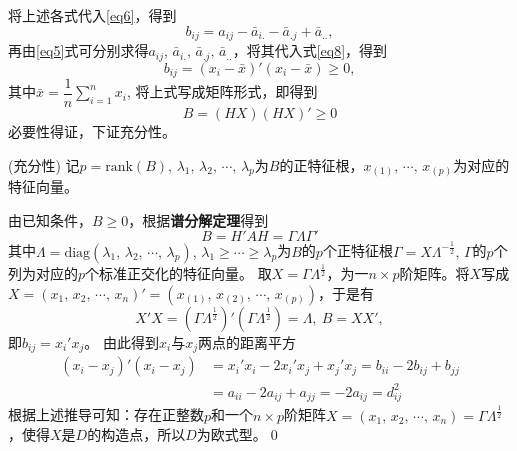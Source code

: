 \documentclass[UTF8, compress]{ctexbeamer}
\begin{document}
	\begin{frame}
		\pause
			将上述各式代入\eqref{eq6}，得到
			\begin{equation}
			\label{eq8}
			b_{ij}=a_{ij}-\bar{a}_{i.}-\bar{a}_{.j}+\bar{a}_{..},
			\end{equation}
		\pause
			再由\eqref{eq5}式可分别求得$a_{ij},\,\bar{a}_{i.},\,\bar{a}_{.j},\,\bar{a}_{..}$，将其代入式\eqref{eq8}，得到
			\begin{equation}
			b_{ij}=(x_i-\bar{x})'(x_i-\bar{x})\geqslant0,
			\end{equation}
			其中$\bar{x}=\dfrac1n\sum\limits_{i=1}^nx_i$,
		\pause
			将上式写成矩阵形式，即得到
			\begin{equation}
			B=(HX)(HX)'\geqslant 0
			\end{equation}
			必要性得证，下证充分性。\\
		\pause
		
			\vspace{.5cm}
			(充分性) 记$p=\mathrm{rank}(B),\,\lambda_1,\,\lambda_2,\,\cdots,\,\lambda_p$为$B$的正特征根，$x_{(1)},\,\cdots,\,x_{(p)}$为对应的特征向量。
	\end{frame}


	\begin{frame}
		
		
		\pause
			由已知条件，$B\geqslant0$，根据\textbf{谱分解定理}得到
			\begin{equation}
			B=H'AH=\varGamma\Lambda\varGamma'
			\end{equation}
			其中$\Lambda=\mathrm{diag}(\lambda_1,\,\lambda_2,\,\cdots,\,\lambda_p),\,\lambda_1\geqslant\cdots\geqslant\lambda_p$为$B$的$p$个正特征根$\varGamma=X\Lambda^{-\frac12},\,\varGamma$的$p$个列为对应的$p$个标准正交化的特征向量。
		\pause
			取$X=\varGamma\Lambda^{\frac12}$，为一$n\times p$阶矩阵。将$X$写成$X=(x_1,\,x_2,\,\cdots,\,x_n)'=(x_{(1)},\,x_{(2)},\,\cdots,\,x_{(p)})$，于是有
			\begin{equation}
			X'X=(\varGamma\Lambda^{\frac12})'(\varGamma\Lambda^{\frac12})=\Lambda,\ B=XX',
			\end{equation}
			即$b_{ij}=x_i'x_j$。
		\pause
			由此得到$x_i$与$x_j$两点的距离平方
			\begin{align}
			(x_i-x_j)'(x_i-x_j) 
			&= x_i'x_i-2x_i'x_j+x_j'x_j=b_{ii}-2b_{ij}+b_{jj}\\
			&= a_{ii}-2a_{ij}+a_{jj}= -2a_{ij}=d_{ij}^2
			\end{align}
		\pause
			根据上述推导可知：存在正整数$p$和一个$n\times p$阶矩阵$X=(x_1,\,x_2,\,\cdots,\,x_n)=\varGamma\Lambda^{\frac12}$，使得$X$是$D$的构造点，所以$D$为欧式型。\qed
	\end{frame}
\end{document}
